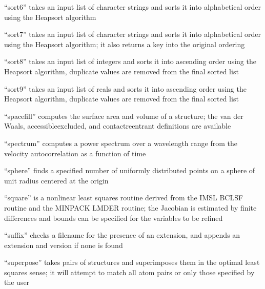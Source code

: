 \documentclass[letterpaper,11pt,english]{sphinxmanual}
\begin{document}

“sort6” takes an input list of character strings and sorts
it into alphabetical order using the Heapsort algorithm


“sort7” takes an input list of character strings and sorts it
into alphabetical order using the Heapsort algorithm; it also
returns a key into the original ordering


“sort8” takes an input list of integers and sorts it into
ascending order using the Heapsort algorithm, duplicate
values are removed from the final sorted list


“sort9” takes an input list of reals and sorts it into
ascending order using the Heapsort algorithm, duplicate
values are removed from the final sorted list


“spacefill” computes the surface area and volume of
a structure; the van der Waals, accessible\sphinxhyphen{}excluded,
and contact\sphinxhyphen{}reentrant definitions are available


“spectrum” computes a power spectrum over a wavelength range
from the velocity autocorrelation as a function of time


“sphere” finds a specified number of uniformly distributed
points on a sphere of unit radius centered at the origin


“square” is a nonlinear least squares routine derived from the
IMSL BCLSF routine and the MINPACK LMDER routine; the Jacobian
is estimated by finite differences and bounds can be specified
for the variables to be refined


“suffix” checks a filename for the presence of an extension,
and appends an extension and version if none is found


“superpose” takes pairs of structures and superimposes them
in the optimal least squares sense; it will attempt to match
all atom pairs or only those specified by the user
\end{document}
